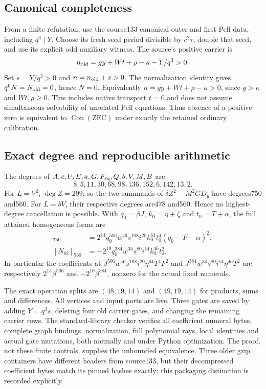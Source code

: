 \subsection{Canonical completeness}
From a finite refutation, use the source133 canonical outer and first
Pell data, including $q^3\mid Y$. Choose its fresh seed period divisible
by $c^2\tau$, double that seed, and use its explicit odd auxiliary
witness. The source's positive carrier is
\[
 n_{\rm old}=gy+Wt+\rho-\kappa-Y/q^3>0.
\]
Set $s=Y/q^3>0$ and $n=n_{\rm old}+s>0$.
The normalization identity gives $q^6N=N_{\rm old}=0$, hence $N=0$.
Equivalently $n=gy+Wt+\rho-\kappa>0$, since $g>\kappa$ and
$Wt,\rho\ge0$. This includes native transport $t=0$ and does not
assume simultaneous solvability of unrelated Pell equations.
Thus absence of a positive zero is equivalent to $\operatorname{Con}
(\mathrm{ZFC})$ under exactly the retained ordinary calibration.

\subsection{Exact degree and reproducible arithmetic}
The degrees of $A,c,U,E,a,G,F_{\rm sq},Q,b,V,M,B$ are
\[
 8,5,11,30,68,98,136,152,6,142,13,2.
\]
For $L=V^2$, $\deg Z=299$, so the two summands of
$\delta Z^2-M^2GD_y$ have degrees750 and560. For $L=bV$, their
respective degrees are478 and560. Hence no highest-degree cancellation
is possible.
With $q_0=\beta J$, $k_0=\eta+\zeta$ and $t_0=T+\alpha$, the full
attained homogeneous forms are
\begin{align*}
 [N_{81}]_{750}&=2^{14}q_0^{506}w^{46}s^{108}i^{20}k_0^{64}
 t_0^4(q_0-F-\alpha)^2,\\
 [N_{82}]_{560}&=-2^{10}q_0^{384}w^{34}s^{80}i^{14}k_0^{46}t_0^2.
\end{align*}
In particular the coefficients at
$J^{506}w^{46}s^{108}i^{20}\eta^{64}T^4F^2$ and
$J^{384}w^{34}s^{80}i^{14}\eta^{46}T^2$ are respectively
$2^{14}\beta^{506}$ and $-2^{10}\beta^{384}$, nonzero for the actual
fixed numerals.

The exact operation splits are $(48,19,14)$ and $(49,19,14)$ for products,
sums and differences. All vertices and input ports are live. Three gates
are saved by adding $Y=q^3s$, deleting four old carrier gates, and changing
the remaining carrier rows. The standard-library checker verifies all
coefficient numeral bytes, complete graph bindings, normalization,
full polynomial rays, local identities and actual gate mutations, both
normally and under Python optimization. The proof, not these finite
controls, supplies the unbounded equivalence. Three older gzip containers
have different headers from source133, but their decompressed coefficient
bytes match its pinned hashes exactly; this packaging distinction is
recorded explicitly.
